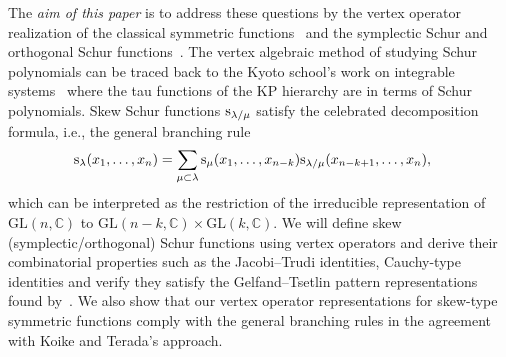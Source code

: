 \documentclass[pdftex]{sigma}
\numberwithin{equation}{section}
\begin{document}
The {\it aim of this paper} is to address these questions by
the vertex operator
realization of the classical symmetric functions~\cite{Jing1991} and the symplectic Schur and orthogonal Schur functions~\cite{Ba1996,JN2015}. The vertex algebraic method of studying Schur polynomials
can be traced back to the Kyoto school's work on integrable systems~\cite{DJKM} where the tau functions of the KP hierarchy are in terms of Schur polynomials.
Skew Schur functions ${\rm s}_{\lambda/\mu}$ satisfy the celebrated decomposition formula, i.e., the general branching rule
\begin{align*}%
&{\rm s}_\lambda(x_1,\dots,x_n)=\sum_{\mu\subset\lambda}{\rm s}_\mu(x_1,\dots,x_{n-k}){\rm s}_{\lambda/\mu}(x_{n-k+1},\dots,x_{n}),
\end{align*}
which can be interpreted as the restriction of the irreducible representation of $\mathrm{GL}(n,\mathbb{C})$ to $\mathrm{GL}(n-k,\mathbb{C})\times \mathrm{GL}(k,\mathbb{C})$.
We will define skew (symplectic/orthogonal) Schur functions using vertex operators and derive their combinatorial properties such as the Jacobi--Trudi identities, Cauchy-type identities and verify they satisfy the Gelfand--Tsetlin pattern representations found by~\cite{AF2020}.
We also show that our vertex operator representations for skew-type symmetric functions comply with the general branching rules in the agreement with
Koike and Terada's approach.
\end{document}
